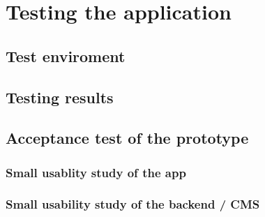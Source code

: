 \chapter[Testing the application]{Testing the application}
\section{Test enviroment}

\section{Testing results}

\section{Acceptance test of the prototype}

\subsection{Small usablity study of the app}

\subsection{Small usability study of the backend / CMS}
